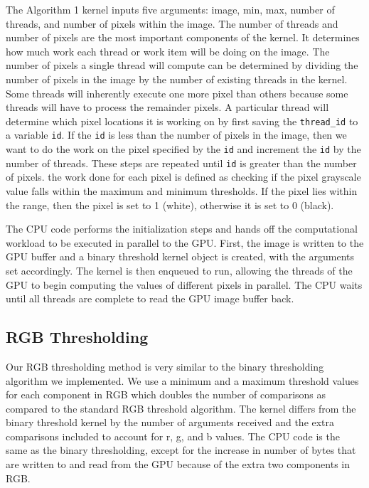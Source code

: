 \documentclass[conference]{IEEEtran}
\begin{document}
The Algorithm 1 kernel inputs five arguments: image, min, max, number of threads, and number of pixels within the image. The number of threads and number of pixels are the most important components of the kernel. It determines how much work each thread or work item will be doing on the image. The number of pixels a single thread will compute can be determined by dividing the number of pixels in the image by the number of existing threads in the kernel. Some threads will inherently execute one more pixel than others because some threads will have to process the remainder pixels. A particular thread will determine which pixel locations it is working on by first saving the \verb|thread_id| to a variable \verb|id|. If the \verb|id| is less than the number of pixels in the image, then we want to do the work on the pixel specified by the \verb|id| and increment the \verb|id| by the number of threads. These steps are repeated until \verb|id| is greater than the number of pixels. the work done for each pixel is defined as checking if the pixel grayscale value falls within the maximum and minimum thresholds. If the pixel lies within the range, then the pixel is set to 1 (white), otherwise it is set to 0 (black). 

The CPU code performs the initialization steps and hands off the computational workload to be executed in parallel to the GPU. First, the image is written to the GPU buffer and a binary threshold kernel object is created, with the arguments set accordingly. The kernel is then enqueued to run, allowing the threads of the GPU to begin computing the values of different pixels in parallel. The CPU waits until all threads are complete to read the GPU image buffer back.

\subsection{RGB Thresholding}

Our RGB thresholding method is very similar to the binary thresholding algorithm we implemented. We use a minimum and a maximum threshold values for each component in RGB which doubles the number of comparisons as compared to the standard RGB threshold algorithm. The kernel differs from the binary threshold kernel by the number of arguments received and the extra comparisons included to account for r, g, and b values. The CPU code is the same as the binary thresholding, except for the increase in number of bytes that are written to and read from the GPU because of the extra two components in RGB.
\end{document}
